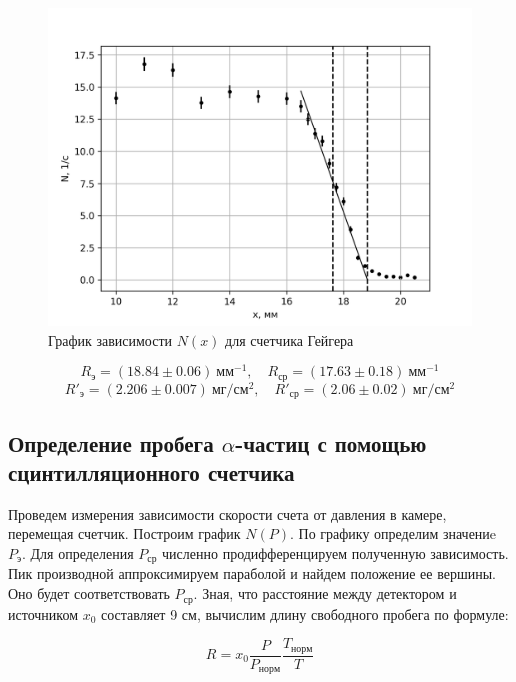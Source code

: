 \documentclass[14pt, a4paper]{report}
\begin{document}
\begin{figure}[H]
\centering
\includegraphics[width=.8\linewidth]{../images/541-4}
\caption{График зависимости $N(x)$ для счетчика Гейгера}
\end{figure}

\[R_{э}=(18.84\pm0.06)\ мм^{-1},\quad R_{ср}=(17.63\pm0.18)\ мм^{-1}\]
\[R'_{э}=(2.206\pm0.007)\ мг/см^2,\quad R'_{ср}=(2.06\pm0.02)\ мг/см^2\]

\newpage

\subsection{Определение пробега $\alpha$-частиц с помощью сцинтилляционного счетчика}

Проведем измерения зависимости скорости счета от давления в камере, перемещая счетчик. Построим график $N(P)$. По графику определим значениe $P_{э}$. Для определения $P_{ср}$ численно продифференцируем полученную зависимость. Пик производной аппроксимируем параболой и найдем положение ее вершины. Оно будет соответствовать $P_{ср}$. Зная, что расстояние между детектором и источником $x_0$ составляет 9 см, вычислим длину свободного пробега по формуле:

\[R=x_0\frac{P}{P_{норм}}\frac{T_{норм}}{T}\]
\end{document}
